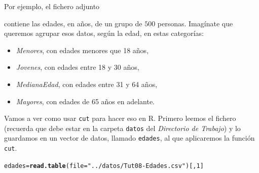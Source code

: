 \documentclass[10pt,a4paper]{article}\usepackage[]{graphicx}\usepackage[]{color}
\makeatletter
\newcommand{\hlnum}[1]{\textcolor[rgb]{0.686,0.059,0.569}{#1}}%
\newcommand{\hlstr}[1]{\textcolor[rgb]{0.192,0.494,0.8}{#1}}%
\newcommand{\hlstd}[1]{\textcolor[rgb]{0.345,0.345,0.345}{#1}}%
\newcommand{\hlkwb}[1]{\textcolor[rgb]{0.69,0.353,0.396}{#1}}%
\newcommand{\hlkwc}[1]{\textcolor[rgb]{0.333,0.667,0.333}{#1}}%
\newcommand{\hlkwd}[1]{\textcolor[rgb]{0.737,0.353,0.396}{\textbf{#1}}}%
\newenvironment{kframe}{%
 \def\at@end@of@kframe{}%
 \ifinner\ifhmode%
  \def\at@end@of@kframe{\end{minipage}}%
  \begin{minipage}{\columnwidth}%
 \fi\fi%
 \def\FrameCommand##1{\hskip\@totalleftmargin \hskip-\fboxsep
 \colorbox{shadecolor}{##1}\hskip-\fboxsep
     \hskip-\linewidth \hskip-\@totalleftmargin \hskip\columnwidth}%
 \MakeFramed {\advance\hsize-\width
   \@totalleftmargin\z@ \linewidth\hsize
   \@setminipage}}%
 {\par\unskip\endMakeFramed%
 \at@end@of@kframe}
\newenvironment{knitrout}{}{} %
\newcounter {cont01}
\makeatother
\begin{document}
Por ejemplo, el fichero adjunto
\begin{center}
\end{center}
contiene las edades, en años, de un grupo de $500$ personas. Imagínate que queremos agrupar esos datos, según la edad, en estas categorías:

\begin{itemize}
  \item {\em Menores}, con edades menores que 18 años,
  \item {\em Jovenes}, con edades entre 18 y 30 años,
  \item {\em MedianaEdad}, con edades entre 31 y 64 años,
  \item {\em Mayores}, con edades de 65 años en adelante.
\end{itemize}
Vamos a ver como usar {\tt cut} para hacer eso en R. Primero leemos el fichero (recuerda que debe estar en la carpeta {\tt datos} del {\em Directorio de Trabajo}) y lo guardamos en un vector de datos, llamado {\tt edades}, al que aplicaremos la función {\tt cut}.

\begin{knitrout}
\color{fgcolor}\begin{kframe}
\begin{alltt}
\hlstd{edades} \hlkwb{=} \hlkwd{read.table}\hlstd{(}\hlkwc{file}\hlstd{=}\hlstr{"../datos/Tut08-Edades.csv"}\hlstd{)[ ,}\hlnum{1}\hlstd{]}
\end{alltt}
\end{kframe}
\end{knitrout}
\end{document}

